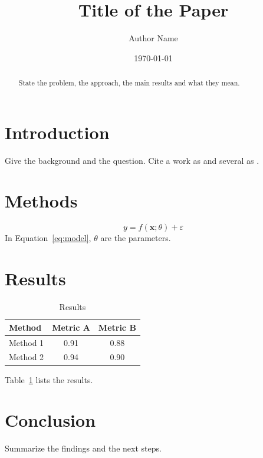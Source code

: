 \documentclass[11pt]{article}
\title{Title of the Paper}
\author{Author Name}
\date{\today}
\begin{document}
\maketitle

\begin{abstract}
State the problem, the approach, the main results and what they mean.
\end{abstract}

\section{Introduction}

Give the background and the question. Cite a work as \cite{lecun2015deep}
and several as \cite{lecun2015deep,knuth1984texbook}.

\section{Methods}

\begin{equation}
  y = f(\mathbf{x}; \theta) + \varepsilon
  \label{eq:model}
\end{equation}
In Equation~\eqref{eq:model}, $\theta$ are the parameters.

\section{Results}

\begin{table}[H]
  \centering
  \caption{Results}
  \label{tab:results}
  \begin{tabular}{lcc}
    \toprule
    Method & Metric A & Metric B \\
    \midrule
    Method 1 & 0.91 & 0.88 \\
    Method 2 & 0.94 & 0.90 \\
    \bottomrule
  \end{tabular}
\end{table}

Table~\ref{tab:results} lists the results.

\section{Conclusion}

Summarize the findings and the next steps.



\end{document}
